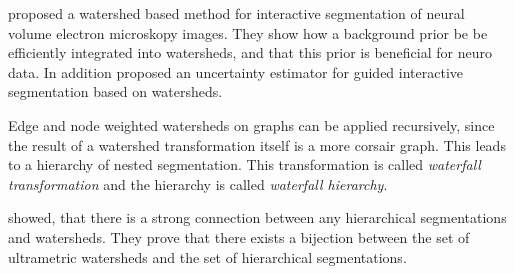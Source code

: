 \citet{straehle_2011_miccai} proposed a watershed based method for interactive segmentation
of neural volume electron  microskopy images.
They show how a background prior be be efficiently integrated into watersheds,
and that this prior is beneficial for neuro data.
In addition \citet{straehle_2012_cvpr} proposed an uncertainty estimator for
guided interactive segmentation based on watersheds.

\label{sec:rw_waterfall}

Edge and node weighted watersheds on graphs can be applied recursively, since
the result of a watershed transformation itself is a more corsair graph.
This leads to a hierarchy of nested segmentation.
This transformation is called \emph{waterfall transformation} \cite{beuchner_1994_waterfall} and
the hierarchy is called \emph{waterfall hierarchy}.

 showed, that there is a
strong connection between any hierarchical segmentations
and watersheds.
They prove that there exists a bijection between
the set of ultrametric watersheds\citep{najman_2010_corr} and the set of hierarchical segmentations.

